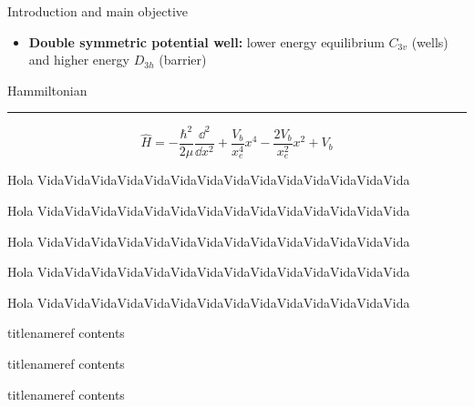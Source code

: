 \documentclass[final]{beamer}
\newcommand{\sepvert}{0.5cm}
\newlength{\colwidth}
\begin{document}
\begin{frame}[t]
\begin{columns}[t]
\begin{column}{\colwidth}
\begin{block}{Introduction and main objective}
\begin{itemize}
					\item \textbf{Double symmetric potential well:} lower energy
						equilibrium $C_{3v}$ (wells) and higher energy $D_{3h}$ 
						(barrier)

				\end{itemize}
			\end{block}
			
			\begin{alertblock}{Hammiltonian}
				\vspace{-\sepvert} \hrule \vspace{0.8cm}
			
				\begin{equation*}
					\hat{H} =
					- \frac{ \hbar^2 }{2 \mu} \frac{ \dd^2 }{ \dd{x^2} } +
					\frac{V_b}{x_e^4} x^4 - \frac{2V_b}{x_e^2} x^2 + V_b
				\end{equation*}

			\end{alertblock}
			
			\begin{exampleblock}{Hola}
				VidaVidaVidaVidaVidaVidaVidaVidaVidaVidaVidaVidaVidaVida
			\end{exampleblock}

			\begin{xmybox}{Hola}
				VidaVidaVidaVidaVidaVidaVidaVidaVidaVidaVidaVidaVidaVida
			\end{xmybox}
			
			\begin{defbox}{Hola}
				VidaVidaVidaVidaVidaVidaVidaVidaVidaVidaVidaVidaVidaVida
			\end{defbox}

			\begin{infobox}{Hola}
				VidaVidaVidaVidaVidaVidaVidaVidaVidaVidaVidaVidaVidaVida
			\end{infobox}

			\begin{exabox}{Hola}
				VidaVidaVidaVidaVidaVidaVidaVidaVidaVidaVidaVidaVidaVida
			\end{exabox}

			\begin{thm}{title}{nameref}
				contents
			\end{thm}

			\begin{prop}{title}{nameref}
				contents
			\end{prop}

			\begin{conj}{title}{nameref}
				contents
			\end{conj}


\end{column}
\end{columns}
\end{frame}
\end{document}
